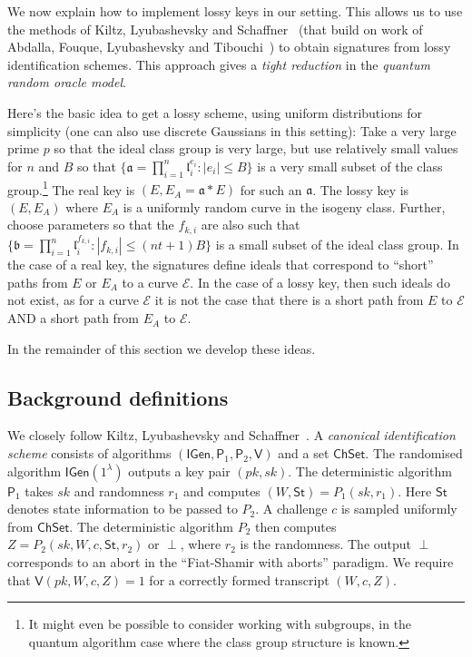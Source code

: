 \documentclass{llncs}
\newcommand{\E}{\mathcal{E}}
\renewcommand{\a}{\mathfrak{a}}
\renewcommand{\b}{\mathfrak{b}}
\renewcommand{\l}{\mathfrak{l}}
\newcommand{\IGen}{\mathsf{IGen}}
\newcommand{\PP}{\mathsf{P}}
\newcommand{\VV}{\mathsf{V}}
\newcommand{\ChSet}{\textsf{ChSet}}
\newcommand{\St}{\textsf{St}}
\begin{document}
We now explain how to implement lossy keys in our setting.
This allows us to use the methods of Kiltz, Lyubashevsky and Schaffner~\cite{KLS18} (that build on work of Abdalla, Fouque, Lyubashevsky and Tibouchi~\cite{AFLT12}) to obtain signatures from lossy identification schemes. This approach gives a \emph{tight reduction} in the \emph{quantum random oracle model}.


Here's the basic idea to get a lossy scheme, using uniform distributions for simplicity (one can also use discrete Gaussians in this setting):
Take a very large prime $p$ so that the ideal class group is very large, but use relatively small values for $n$ and $B$ so that $\{ \a = \prod_{i=1}^n \l_i^{e_i} : |e_i| \le B \}$ is a very small subset of the class group.\footnote{It might even be possible to consider working with subgroups, in the quantum algorithm case where the class group structure is known.}
The real key is $(E, E_A = \a*E )$ for such an $\a$.
The lossy key is $(E, E_A )$ where $E_A$ is a uniformly random curve in the isogeny class.
Further, choose parameters so that the $f_{k,i}$ are also such that $\{ \b = \prod_{i=1}^n \l_i^{f_{k,i}} : |f_{k,i}| \le (nt+1)B \}$ is a small subset of the ideal class group.
In the case of a real key, the signatures define ideals that correspond to ``short'' paths from $E$ or $E_A$ to a  curve $\E$.
In the case of a lossy key, then such ideals do not exist, as for a curve $\E$ it is not the case that there is a short path from $E$ to $\E$ AND a short path from $E_A$ to $\E$.

In the remainder of this section we develop these ideas.


\subsection{Background definitions} \label{sec:KLS-defns}

We closely follow Kiltz, Lyubashevsky and Schaffner~\cite{KLS18}.
A \emph{canonical identification scheme} consists of algorithms $(\IGen, \PP_1, \PP_2, \VV)$ and a set $\ChSet$. The randomised algorithm $\IGen( 1^\lambda )$ outputs a key pair $(pk,sk)$.
The deterministic algorithm $\PP_1$ takes $sk$ and randomness $r_1$ and computes $(W, \St) = P_1( sk, r_1 )$. 
Here $\St$ denotes state information to be passed to $P_2$.
A challenge $c$ is sampled uniformly from $\ChSet$. The deterministic algorithm $P_2$ then computes $Z = P_2( sk, W, c, \St, r_2 )$ or $\perp$, where $r_2$ is the randomness.
The output $\perp$ corresponds to an abort in the ``Fiat-Shamir with aborts'' paradigm.
We require that $\VV( pk, W, c, Z ) = 1$ for a correctly formed transcript $(W,c,Z)$.
\end{document}

